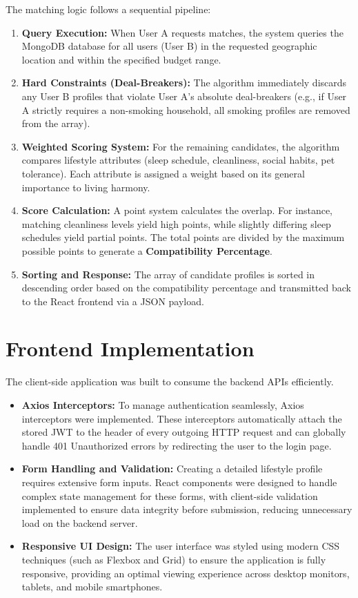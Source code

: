 \documentclass[12pt,a4paper]{report}
\begin{document}
The matching logic follows a sequential pipeline:
\begin{enumerate}
    \item \textbf{Query Execution:} When User A requests matches, the system queries the MongoDB database for all users (User B) in the requested geographic location and within the specified budget range.
    \item \textbf{Hard Constraints (Deal-Breakers):} The algorithm immediately discards any User B profiles that violate User A's absolute deal-breakers (e.g., if User A strictly requires a non-smoking household, all smoking profiles are removed from the array).
    \item \textbf{Weighted Scoring System:} For the remaining candidates, the algorithm compares lifestyle attributes (sleep schedule, cleanliness, social habits, pet tolerance). Each attribute is assigned a weight based on its general importance to living harmony.
    \item \textbf{Score Calculation:} A point system calculates the overlap. For instance, matching cleanliness levels yield high points, while slightly differing sleep schedules yield partial points. The total points are divided by the maximum possible points to generate a \textbf{Compatibility Percentage}.
    \item \textbf{Sorting and Response:} The array of candidate profiles is sorted in descending order based on the compatibility percentage and transmitted back to the React frontend via a JSON payload.
\end{enumerate}

\section{Frontend Implementation}
The client-side application was built to consume the backend APIs efficiently.
\begin{itemize}
    \item \textbf{Axios Interceptors:} To manage authentication seamlessly, Axios interceptors were implemented. These interceptors automatically attach the stored JWT to the header of every outgoing HTTP request and can globally handle 401 Unauthorized errors by redirecting the user to the login page.
    \item \textbf{Form Handling and Validation:} Creating a detailed lifestyle profile requires extensive form inputs. React components were designed to handle complex state management for these forms, with client-side validation implemented to ensure data integrity before submission, reducing unnecessary load on the backend server.
    \item \textbf{Responsive UI Design:} The user interface was styled using modern CSS techniques (such as Flexbox and Grid) to ensure the application is fully responsive, providing an optimal viewing experience across desktop monitors, tablets, and mobile smartphones.
\end{itemize}
\end{document}
